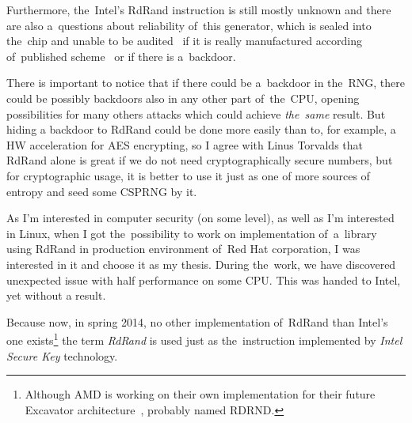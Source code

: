 \par{
Furthermore, the~Intel's RdRand instruction is still mostly unknown 
and there are also a~questions about reliability of~this generator, 
which is sealed into the~chip and unable to be audited~\cite{TheodoreTsoNSA} 
if it is really manufactured according of~published 
scheme~\cite{AnalysisOfDRNG} or if there is a~backdoor. 
}

\par{
There is important to notice that if there could be a~backdoor in the~RNG, 
there could be possibly backdoors also in any other part of~the~CPU, opening 
possibilities for many others attacks which could achieve {\em the~same} result. 
But hiding a backdoor to RdRand could be done more easily than to, 
for example, a HW acceleration for AES encrypting, so I agree with Linus 
Torvalds that RdRand alone is great if we do not need cryptographically secure 
numbers, but for cryptographic usage, it is better to use it just as one of more 
sources of entropy and seed some CSPRNG by it.
}

\par{
As I'm interested in computer security (on some level), 
as well as I'm interested in Linux, 
when I got the~possibility to work on implementation of~a~library using RdRand
in production environment of~Red Hat corporation, 
I was interested in it and choose it as my thesis. 
During the~work, we have discovered unexpected issue with half performance 
on some CPU. This was handed to Intel, yet without a result. 
}
\par{
Because now, in spring 2014, no other implementation of~RdRand than Intel's 
one exists\footnote{Although AMD is working on their own implementation 
for their future Excavator architecture~\cite{AMDRdRand}, probably named 
RDRND.}
the term {\em RdRand} is used just as the~instruction implemented 
by {\em Intel Secure Key} technology.
}


